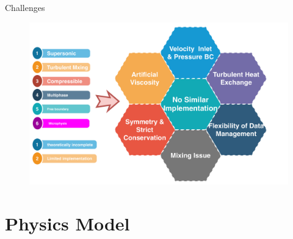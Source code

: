 \documentclass{beamer}
\begin{document}
\begin{frame}{Challenges}
\noindent
\begin{figure}
\centering
\includegraphics[width=.95\textwidth]{./PPT/Challenges}
\end{figure}
\end{frame}

\section{Physics Model}
\end{document}
